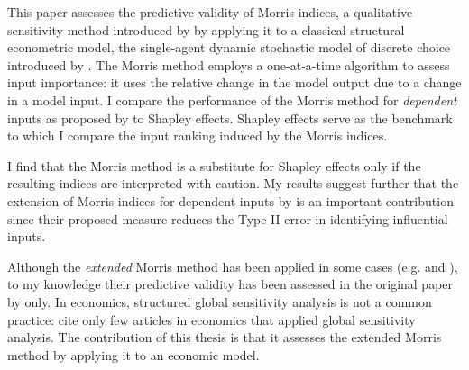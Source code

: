This paper assesses the predictive validity of Morris indices, a qualitative sensitivity method introduced by \citep{M91} by applying it to a classical structural econometric model, the single-agent dynamic stochastic model of discrete choice introduced by \citet{R87}. The Morris method employs a one-at-a-time algorithm to assess input importance: it uses the relative change in the model output due to a change in a model input. I compare the performance of the Morris method for \textit{dependent} inputs as proposed by \citet{GM17} to Shapley effects. Shapley effects serve as the benchmark to which I compare the input ranking induced by the Morris indices.

I find that the Morris method is a substitute for Shapley effects only if the resulting indices are interpreted with caution. %
My results suggest further that the extension of Morris indices for dependent inputs by \citet{GM17} is an important contribution since their proposed measure reduces the Type II error in identifying influential inputs.

Although the \textit{extended} Morris method has been applied in some cases (e.g. \citet{MMA18} and \citet{RZY19}), to my knowledge their predictive validity has been assessed in the original paper by \citet{GM17} only. In economics, structured global sensitivity analysis is not a common practice: \citet{HMSW19} cite only few articles in economics that applied global sensitivity analysis. The contribution of this thesis is that it assesses the extended Morris method by applying it to an economic model.



